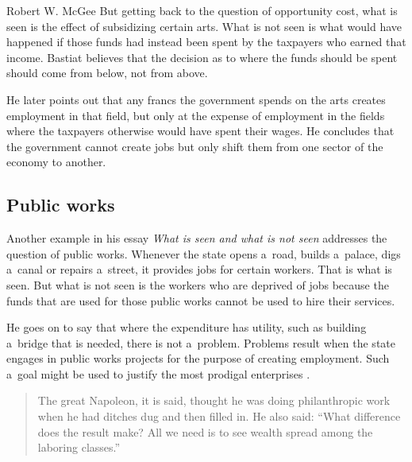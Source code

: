 \begin{artengenv}{Robert W. McGee}
But getting back to the question of opportunity cost, what is seen is the effect of subsidizing certain arts. What is not seen is what would have happened if those funds had instead been spent by the taxpayers who earned that income. Bastiat believes that the decision as to where the funds should be spent should come from below, not from above.



He later points out that any francs the government spends on the arts creates employment in that field, but only at the expense of employment in the fields where the taxpayers otherwise would have spent their wages. He concludes that the government cannot create jobs but only shift them from one sector of the economy to another.



\subsection{Public works}



Another example in his essay \textit{What is seen and what is not seen} 
\parencite[][]{bastiat_selected_1964} %
addresses the question of public works. Whenever the state opens a~road, builds a~palace, digs a~canal or repairs a~street, it provides jobs for certain workers. That is what is seen. But what is not seen is the workers who are deprived of jobs because the funds that are used for those public works cannot be used to hire their services.



He goes on to say that where the expenditure has utility, such as building a~bridge that is needed, there is not a~problem. Problems result when the state engages in public works projects for the purpose of creating employment. Such a~goal might be used to justify the most prodigal enterprises 
\parencite[][p.17]{bastiat_selected_1964}.%




\begin{quote}
The great Napoleon, it is said, thought he was doing philanthropic work when he had ditches dug and then filled in. He also said: ``What difference does the result make? All we need is to see wealth spread among the laboring classes.'' 
\parencite[][p.18]{bastiat_selected_1964}%
\end{quote}





\end{artengenv}
